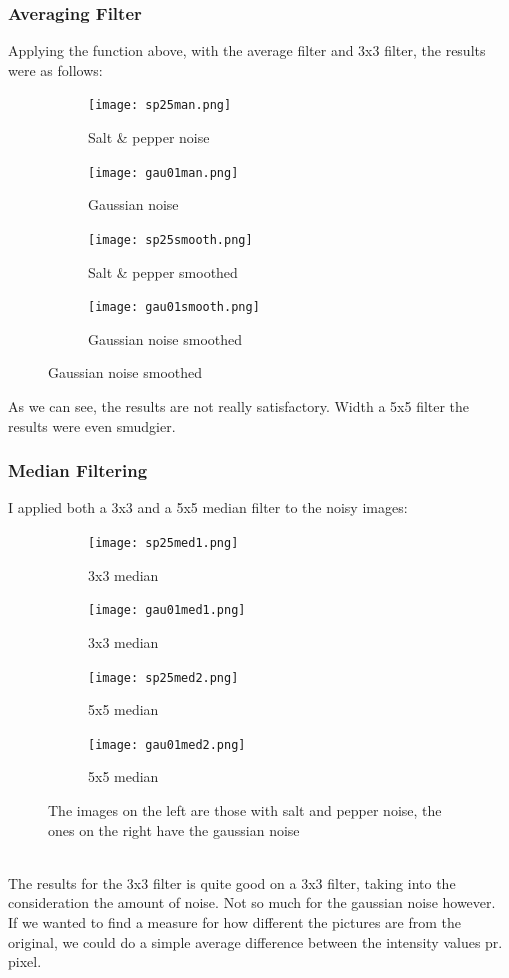 \documentclass{article}
\begin{document}
\subsubsection{Averaging Filter}
Applying the function above, with the average filter and 3x3 filter, the results were as follows:
\begin{figure}[h]
	\centering
	\begin{subfigure}[t]{0.45\textwidth}
		\texttt{[image: sp25man.png]}
		\label{fig:sp25man.png}
		\caption{Salt \& pepper noise}
	\end{subfigure}
	\begin{subfigure}[t]{0.45\textwidth}
		\texttt{[image: gau01man.png]}
		\label{fig:gau01man.png}
		\caption[t]{Gaussian noise}
	\end{subfigure}
	\begin{subfigure}[b]{0.45\textwidth}
		\texttt{[image: sp25smooth.png]}
		\caption{Salt \& pepper smoothed}
		\label{fig:sp25smooth.png}
	\end{subfigure}
	\begin{subfigure}[b]{0.45\textwidth}
		\texttt{[image: gau01smooth.png]}
		\caption{Gaussian noise smoothed}
		\label{fig:gau01smooth.png}
	\end{subfigure}
\end{figure}

As we can see, the results are not really satisfactory. Width a 5x5 filter the results were even smudgier.

\newpage
\subsubsection{Median Filtering}
I applied both a 3x3 and a 5x5 median filter to the noisy images:
\begin{figure}[h!]
	\centering
	\begin{subfigure}[t]{0.4\textwidth}
		\texttt{[image: sp25med1.png]}
		\caption{3x3 median}
		\label{fig:sp25med1.png}
	\end{subfigure}
	\begin{subfigure}[t]{0.4\textwidth}
		\texttt{[image: gau01med1.png]}
		\caption{3x3 median}
		\label{fig:gau01med1.png}
	\end{subfigure}
	\begin{subfigure}[t]{0.4\textwidth}
		\texttt{[image: sp25med2.png]}
		\caption{5x5 median}
		\label{fig:sp25med2.png}
	\end{subfigure}
	\begin{subfigure}[t]{0.4\textwidth}
		\texttt{[image: gau01med2.png]}
		\caption{5x5 median}
		\label{fig:gau01med2.png}
	\end{subfigure}
	\caption{The images on the left are those with salt and pepper noise, the ones on the right have the gaussian noise}
\end{figure}
\\The results for the 3x3 filter is quite good on a 3x3 filter, taking into the consideration the amount of noise. Not so much for the gaussian noise however.
\\If we wanted to find a measure for how different the pictures are from the original, we could do a simple average difference between the intensity values pr. pixel.
\end{document}

